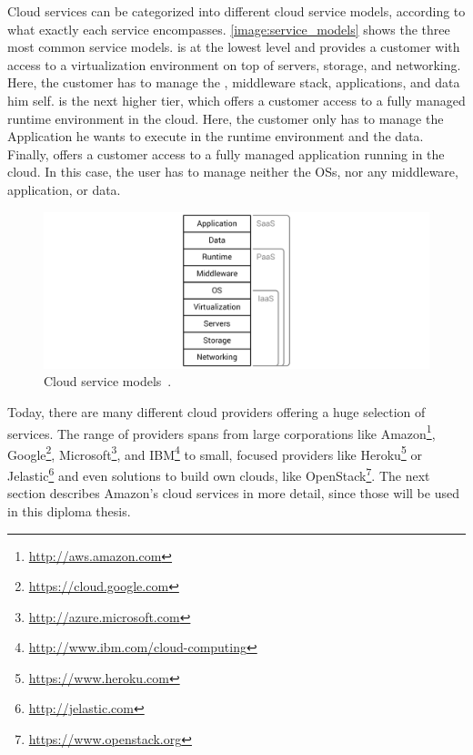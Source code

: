 Cloud services can be categorized into different cloud service models, according to what exactly each service encompasses.
\autoref{image:service_models} shows the three most common service models.
 is at the lowest level and provides a customer with access to a virtualization environment on top of servers, storage, and networking. Here, the customer has to manage the , middleware stack, applications, and data him self.
 is the next higher tier, which offers a customer access to a fully managed runtime environment in the cloud.
Here, the customer only has to manage the Application he wants to execute in the runtime environment and the data.
Finally,  offers a customer access to a fully managed application running in the cloud.
In this case, the user has to manage neither the OSs, nor any middleware, application, or data.

\begin{figure}[!htbp]
	\centering
	\includegraphics[resolution=600]{fundamentals/assets/service_models}
	\caption{Cloud service models~\autocite[based on][]{cloud:def:gabler}.}
	\label{image:service_models}
\end{figure}

Today, there are many different cloud providers offering a huge selection of services.
The range of providers spans from large corporations like Amazon\footnote{\url{http://aws.amazon.com}\label{aws}}, Google\footnote{\url{https://cloud.google.com}}, Microsoft\footnote{\url{http://azure.microsoft.com}}, and IBM\footnote{\url{http://www.ibm.com/cloud-computing}} to small, focused providers like Heroku\footnote{\url{https://www.heroku.com}} or Jelastic\footnote{\url{http://jelastic.com}} and even solutions to build own clouds, like OpenStack\footnote{\url{https://www.openstack.org}}.
The next section describes Amazon's cloud services in more detail, since those will be used in this diploma thesis.

